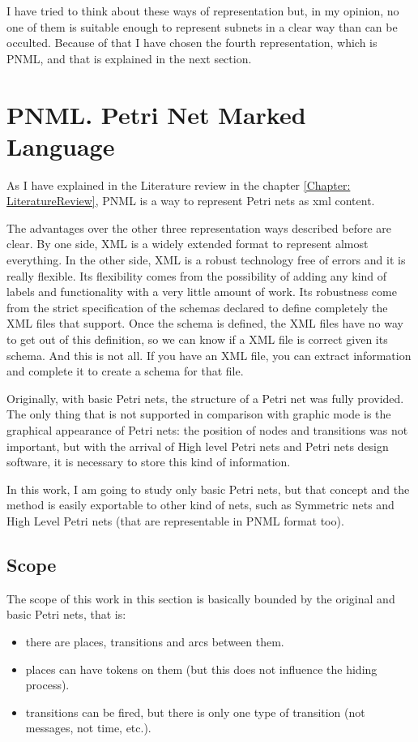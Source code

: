 I have tried to think about these ways of representation but, in my opinion, no one of them is suitable enough to represent subnets in a clear way than can be occulted. Because of that I have chosen the fourth representation, which is PNML, and that is explained in the next section. 

\section{PNML. Petri Net Marked Language}

As I have explained in the Literature review in the chapter \ref{Chapter: LiteratureReview},
 PNML is a way to represent Petri nets as xml content.

The advantages over the other three representation ways described before
are clear. By one side, XML is a widely extended format to represent almost
everything. In the other side, XML is a robust technology free of errors
and it is really flexible. Its flexibility comes from the possibility of adding any kind
of labels and functionality with a very little amount of work. Its robustness come from the strict
specification of the schemas declared to define completely the XML files    
that support. Once
the schema is defined, the XML files have no way to get out of this definition,
so we can know if a XML file is correct given its schema. And this is not all. If you have an XML file, you can extract information and complete it to create a schema for that file.  



Originally, with basic Petri nets, the structure of a Petri net was fully provided.
The only thing that is not supported in comparison with graphic mode is the graphical appearance of Petri nets: the position of nodes and
transitions was not
important, but with the arrival of High level Petri nets and Petri nets design
software, it is necessary to store this kind of information.

In this work, I am going to study only basic Petri nets, but
that concept and the method is easily exportable to other kind of nets, such as Symmetric nets and High Level Petri nets (that are representable in PNML
format too).

\subsection{Scope}
The scope of this work in this section is basically bounded by the original
and basic Petri nets, that is:
\begin{itemize}
\item there are places, transitions and arcs between them.
\item places can have tokens on them (but this does not  influence the hiding process).
\item transitions can be fired, but there is only one type of transition
(not messages, not time, etc.).
\end{itemize}

